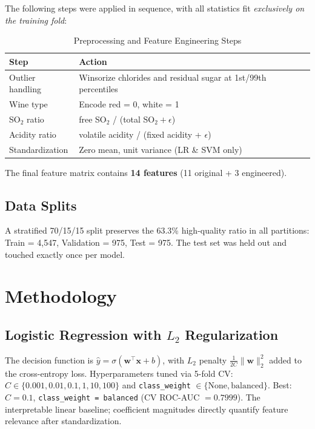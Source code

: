 \documentclass[conference]{IEEEtran}
\begin{document}
The following steps were applied in sequence, with all statistics fit
\emph{exclusively on the training fold}:

\begin{table}[h]
\centering
\caption{Preprocessing and Feature Engineering Steps}
\label{tab:preprocessing}
\begin{tabular}{p{} p{}}
\toprule
\textbf{Step} & \textbf{Action} \\
\midrule
Outlier handling & Winsorize chlorides and residual sugar at 1st/99th percentiles \\
Wine type & Encode red = 0, white = 1 \\
SO$_2$ ratio & free SO$_2$ / (total SO$_2 + \epsilon$) \\
Acidity ratio & volatile acidity / (fixed acidity + $\epsilon$) \\
Standardization & Zero mean, unit variance (LR \& SVM only) \\
\bottomrule
\end{tabular}
\end{table}

The final feature matrix contains \textbf{14 features} (11 original +
3 engineered).

\subsection{Data Splits}

A stratified 70/15/15 split preserves the 63.3\% high-quality ratio in
all partitions: Train = 4{,}547, Validation = 975, Test = 975. The test
set was held out and touched exactly once per model.

\section{Methodology}

\subsection{Logistic Regression with $L_2$ Regularization}

The decision function is
$\hat{y} = \sigma(\mathbf{w}^\top \mathbf{x} + b)$, with $L_2$ penalty
$\frac{1}{2C}\|\mathbf{w}\|_2^2$ added to the cross-entropy loss.
Hyperparameters tuned via 5-fold CV: $C \in \{0.001, 0.01, 0.1, 1, 10,
100\}$ and \texttt{class\_weight} $\in \{\text{None}, \text{balanced}\}$.
Best: $C = 0.1$, \texttt{class\_weight = balanced} (CV ROC-AUC
$= 0.7999$). The interpretable linear baseline; coefficient magnitudes
directly quantify feature relevance after standardization.
\end{document}
